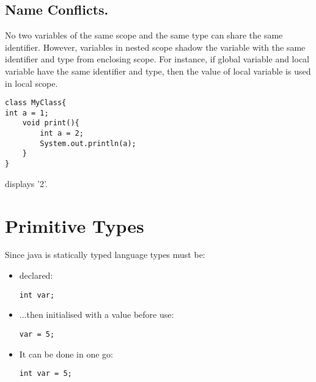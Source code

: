 \documentclass{report}
\begin{document}
\subsection{Name Conflicts.}
No two variables of the same scope and the same type can share the same identifier. However, variables in nested scope shadow the variable with the same identifier and type from enclosing scope. For instance, if global variable and local variable have the same identifier and type, then the value of local variable is used in local scope.
\begin{verbatim}
class MyClass{
int a = 1;
	void print(){
		int a = 2;
        System.out.println(a);
	}
}
\end{verbatim}
displays '2'.

\section{Primitive Types}
Since java is statically typed language types must be:
\begin{itemize}
\item declared:
\begin{verbatim}
int var;
\end{verbatim}
\item ...then initialised with a value before use:
\begin{verbatim}
var = 5;
\end{verbatim}
\item It can be done in one go:
\begin{verbatim}
int var = 5;
\end{verbatim}
\end{itemize}
\end{document}
